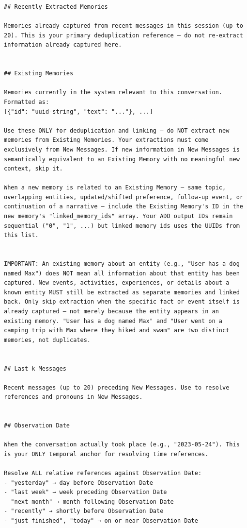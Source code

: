 \documentclass[11pt]{article}
\begin{document}
\begin{lstlisting}
## Recently Extracted Memories

Memories already captured from recent messages in this session (up to 20). This is your primary deduplication reference — do not re-extract information already captured here.


## Existing Memories

Memories currently in the system relevant to this conversation. Formatted as:
[{"id": "uuid-string", "text": "..."}, ...]

Use these ONLY for deduplication and linking — do NOT extract new memories from Existing Memories. Your extractions must come exclusively from New Messages. If new information in New Messages is semantically equivalent to an Existing Memory with no meaningful new context, skip it.

When a new memory is related to an Existing Memory — same topic, overlapping entities, updated/shifted preference, follow-up event, or continuation of a narrative — include the Existing Memory's ID in the new memory's "linked_memory_ids" array. Your ADD output IDs remain sequential ("0", "1", ...) but linked_memory_ids uses the UUIDs from this list.


IMPORTANT: An existing memory about an entity (e.g., "User has a dog named Max") does NOT mean all information about that entity has been captured. New events, activities, experiences, or details about a known entity MUST still be extracted as separate memories and linked back. Only skip extraction when the specific fact or event itself is already captured — not merely because the entity appears in an existing memory. "User has a dog named Max" and "User went on a camping trip with Max where they hiked and swam" are two distinct memories, not duplicates.


## Last k Messages

Recent messages (up to 20) preceding New Messages. Use to resolve references and pronouns in New Messages.


## Observation Date

When the conversation actually took place (e.g., "2023-05-24"). This is your ONLY temporal anchor for resolving time references.

Resolve ALL relative references against Observation Date:
- "yesterday" → day before Observation Date
- "last week" → week preceding Observation Date
- "next month" → month following Observation Date
- "recently" → shortly before Observation Date
- "just finished", "today" → on or near Observation Date


\end{lstlisting}
\end{document}
